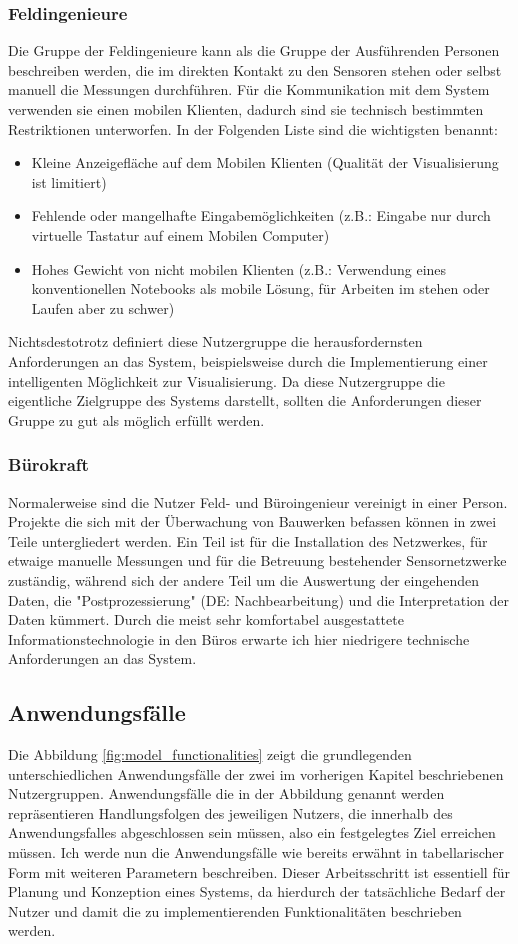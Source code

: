 \subsubsection{Feldingenieure}
Die Gruppe der Feldingenieure kann als die Gruppe der Ausführenden Personen beschreiben werden, die im direkten Kontakt zu den Sensoren stehen oder selbst manuell die Messungen durchführen. Für die Kommunikation mit dem System verwenden sie einen mobilen Klienten, dadurch sind sie technisch bestimmten Restriktionen unterworfen. In der Folgenden Liste sind die wichtigsten benannt:
\begin{itemize}
\item Kleine Anzeigefläche auf dem Mobilen Klienten (Qualität der Visualisierung ist limitiert)
\item Fehlende oder mangelhafte Eingabemöglichkeiten (z.B.: Eingabe nur durch virtuelle Tastatur auf einem Mobilen Computer)
\item Hohes Gewicht von nicht mobilen Klienten (z.B.: Verwendung eines konventionellen Notebooks als mobile Lösung, für Arbeiten im stehen oder Laufen aber zu schwer)
\end{itemize}
Nichtsdestotrotz definiert diese Nutzergruppe die herausfordernsten Anforderungen an das System, beispielsweise durch die Implementierung einer intelligenten Möglichkeit zur Visualisierung. Da diese Nutzergruppe die eigentliche Zielgruppe des Systems darstellt, sollten die Anforderungen dieser Gruppe zu gut als möglich erfüllt werden.

\subsubsection{Bürokraft}
Normalerweise sind die Nutzer Feld- und Büroingenieur vereinigt in einer Person. Projekte die sich mit der Überwachung von Bauwerken befassen können in zwei Teile untergliedert werden. Ein Teil ist für die Installation des Netzwerkes, für etwaige manuelle Messungen und für die Betreuung bestehender Sensornetzwerke zuständig, während sich der andere Teil um die Auswertung der eingehenden Daten, die "Postprozessierung" (DE: Nachbearbeitung) und die Interpretation der Daten kümmert. Durch die meist sehr komfortabel ausgestattete Informationstechnologie in den Büros erwarte ich hier niedrigere technische Anforderungen an das System.

\subsection{Anwendungsfälle}
Die Abbildung \ref{fig:model_functionalities} zeigt die grundlegenden unterschiedlichen Anwendungsfälle der zwei im vorherigen Kapitel beschriebenen Nutzergruppen. Anwendungsfälle die in der Abbildung genannt werden repräsentieren Handlungsfolgen des jeweiligen Nutzers, die innerhalb des Anwendungsfalles abgeschlossen sein müssen, also ein festgelegtes Ziel erreichen müssen. Ich werde nun die Anwendungsfälle wie bereits erwähnt in tabellarischer Form mit weiteren Parametern beschreiben. Dieser Arbeitsschritt ist essentiell für Planung und Konzeption eines Systems, da hierdurch der tatsächliche Bedarf der Nutzer und damit die zu implementierenden Funktionalitäten beschrieben werden.

